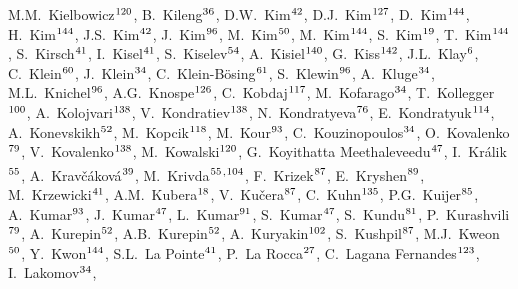 \begin{flushleft}
M.M.~Kielbowicz$^\textrm{\scriptsize 120}$,
B.~Kileng$^\textrm{\scriptsize 36}$,
D.W.~Kim$^\textrm{\scriptsize 42}$,
D.J.~Kim$^\textrm{\scriptsize 127}$,
D.~Kim$^\textrm{\scriptsize 144}$,
H.~Kim$^\textrm{\scriptsize 144}$,
J.S.~Kim$^\textrm{\scriptsize 42}$,
J.~Kim$^\textrm{\scriptsize 96}$,
M.~Kim$^\textrm{\scriptsize 50}$,
M.~Kim$^\textrm{\scriptsize 144}$,
S.~Kim$^\textrm{\scriptsize 19}$,
T.~Kim$^\textrm{\scriptsize 144}$,
S.~Kirsch$^\textrm{\scriptsize 41}$,
I.~Kisel$^\textrm{\scriptsize 41}$,
S.~Kiselev$^\textrm{\scriptsize 54}$,
A.~Kisiel$^\textrm{\scriptsize 140}$,
G.~Kiss$^\textrm{\scriptsize 142}$,
J.L.~Klay$^\textrm{\scriptsize 6}$,
C.~Klein$^\textrm{\scriptsize 60}$,
J.~Klein$^\textrm{\scriptsize 34}$,
C.~Klein-B\"{o}sing$^\textrm{\scriptsize 61}$,
S.~Klewin$^\textrm{\scriptsize 96}$,
A.~Kluge$^\textrm{\scriptsize 34}$,
M.L.~Knichel$^\textrm{\scriptsize 96}$,
A.G.~Knospe$^\textrm{\scriptsize 126}$,
C.~Kobdaj$^\textrm{\scriptsize 117}$,
M.~Kofarago$^\textrm{\scriptsize 34}$,
T.~Kollegger$^\textrm{\scriptsize 100}$,
A.~Kolojvari$^\textrm{\scriptsize 138}$,
V.~Kondratiev$^\textrm{\scriptsize 138}$,
N.~Kondratyeva$^\textrm{\scriptsize 76}$,
E.~Kondratyuk$^\textrm{\scriptsize 114}$,
A.~Konevskikh$^\textrm{\scriptsize 52}$,
M.~Kopcik$^\textrm{\scriptsize 118}$,
M.~Kour$^\textrm{\scriptsize 93}$,
C.~Kouzinopoulos$^\textrm{\scriptsize 34}$,
O.~Kovalenko$^\textrm{\scriptsize 79}$,
V.~Kovalenko$^\textrm{\scriptsize 138}$,
M.~Kowalski$^\textrm{\scriptsize 120}$,
G.~Koyithatta Meethaleveedu$^\textrm{\scriptsize 47}$,
I.~Kr\'{a}lik$^\textrm{\scriptsize 55}$,
A.~Krav\v{c}\'{a}kov\'{a}$^\textrm{\scriptsize 39}$,
M.~Krivda$^\textrm{\scriptsize 55}$\textsuperscript{,}$^\textrm{\scriptsize 104}$,
F.~Krizek$^\textrm{\scriptsize 87}$,
E.~Kryshen$^\textrm{\scriptsize 89}$,
M.~Krzewicki$^\textrm{\scriptsize 41}$,
A.M.~Kubera$^\textrm{\scriptsize 18}$,
V.~Ku\v{c}era$^\textrm{\scriptsize 87}$,
C.~Kuhn$^\textrm{\scriptsize 135}$,
P.G.~Kuijer$^\textrm{\scriptsize 85}$,
A.~Kumar$^\textrm{\scriptsize 93}$,
J.~Kumar$^\textrm{\scriptsize 47}$,
L.~Kumar$^\textrm{\scriptsize 91}$,
S.~Kumar$^\textrm{\scriptsize 47}$,
S.~Kundu$^\textrm{\scriptsize 81}$,
P.~Kurashvili$^\textrm{\scriptsize 79}$,
A.~Kurepin$^\textrm{\scriptsize 52}$,
A.B.~Kurepin$^\textrm{\scriptsize 52}$,
A.~Kuryakin$^\textrm{\scriptsize 102}$,
S.~Kushpil$^\textrm{\scriptsize 87}$,
M.J.~Kweon$^\textrm{\scriptsize 50}$,
Y.~Kwon$^\textrm{\scriptsize 144}$,
S.L.~La Pointe$^\textrm{\scriptsize 41}$,
P.~La Rocca$^\textrm{\scriptsize 27}$,
C.~Lagana Fernandes$^\textrm{\scriptsize 123}$,
I.~Lakomov$^\textrm{\scriptsize 34}$,

\end{flushleft}
